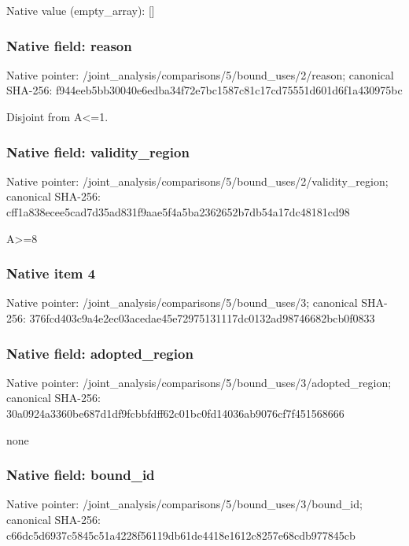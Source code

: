 \documentclass[10pt,a4paper]{article}
\begin{document}
Native value (empty\_\allowbreak{}array): []

\subsubsection{Native field: reason}
Native pointer: /joint\_\allowbreak{}analysis/comparisons/5/bound\_\allowbreak{}uses/2/reason; canonical SHA-256: f944eeb5bb30040e6edba34f72e7bc1587c81c17cd75551d601d6f1a430975bc

\begingroup\raggedright\sloppy Disjoint from A<=\allowbreak{}1.\par\endgroup

\subsubsection{Native field: validity\_\allowbreak{}region}
Native pointer: /joint\_\allowbreak{}analysis/comparisons/5/bound\_\allowbreak{}uses/2/validity\_\allowbreak{}region; canonical SHA-256: cff1a838ecee5cad7d35ad831f9aae5f4a5ba2362652b7db54a17dc48181cd98

\begingroup\raggedright\sloppy A>=\allowbreak{}8\par\endgroup

\subsubsection{Native item 4}
Native pointer: /joint\_\allowbreak{}analysis/comparisons/5/bound\_\allowbreak{}uses/3; canonical SHA-256: 376fcd403c9a4e2ec03acedae45e72975131117dc0132ad98746682bcb0f0833

\subsubsection{Native field: adopted\_\allowbreak{}region}
Native pointer: /joint\_\allowbreak{}analysis/comparisons/5/bound\_\allowbreak{}uses/3/adopted\_\allowbreak{}region; canonical SHA-256: 30a0924a3360be687d1df9fcbbfdff62c01bc0fd14036ab9076cf7f451568666

\begingroup\raggedright\sloppy none\par\endgroup

\subsubsection{Native field: bound\_\allowbreak{}id}
Native pointer: /joint\_\allowbreak{}analysis/comparisons/5/bound\_\allowbreak{}uses/3/bound\_\allowbreak{}id; canonical SHA-256: c66dc5d6937c5845c51a4228f56119db61de4418e1612c8257e68cdb977845cb
\end{document}
